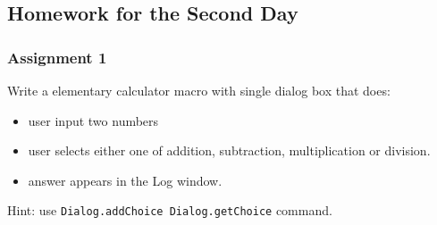 \documentclass[11pt,a4paper,oneside]{report}
\newcommand{\ilcom}[1]{\texttt{\small#1}}
\begin{document}
\subsection{Homework for the Second Day}

\subsubsection{Assignment 1}
Write a elementary calculator macro with single dialog box that does:
\begin{itemize}
\item user input two numbers
\item user selects either one of addition, subtraction, multiplication or division. 
\item answer appears in the Log window. 
 \end{itemize}
Hint: use \ilcom{Dialog.addChoice Dialog.getChoice} command.   
\end{document}
